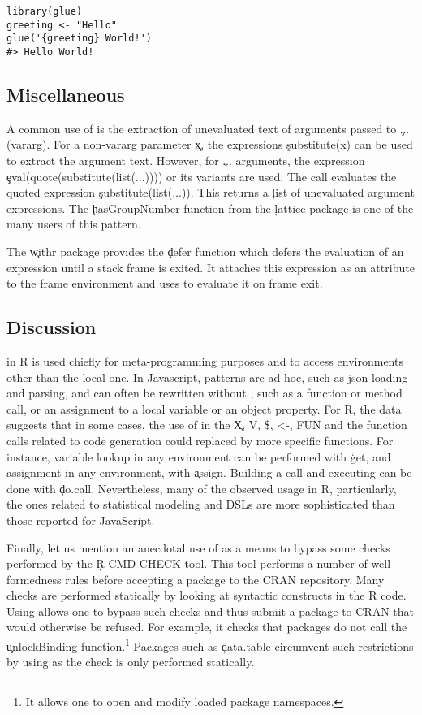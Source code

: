 \documentclass[screen,acmsmall]{acmart}
\begin{document}
\begin{lstlisting}
library(glue)
greeting <- "Hello"
glue('{greeting} World!')
#> Hello World!
\end{lstlisting}

\subsection{Miscellaneous}
A common use of \eval is the extraction of unevaluated text of arguments passed
to \c{...} (vararg). For a non-vararg parameter \c{x}, the expressions
\c{substitute(x)} can be used to extract the argument text. However, for \c{...}
arguments, the expression \c{eval(quote(substitute(list(...))))} or its variants
are used. The \eval call evaluates the quoted expression
\c{substitute(list(...))}. This returns a \c{list} of unevaluated argument
expressions. The \c{hasGroupNumber} function from the \c{lattice} package is one
of the many users of this pattern.

The \c{withr} package provides the \c{defer} function which defers the
evaluation of an expression until a stack frame is exited. It attaches this
expression as an attribute to the frame environment and uses \eval to evaluate
it on frame exit.

\subsection{Discussion}

\Eval in R is used chiefly for meta-programming purposes and to access
environments other than the local one. In Javascript, patterns are ad-hoc, such
as json loading and parsing, and can often be rewritten without \eval, such as a
function or method call, or an assignment to a local variable or an object
property. For R, the data suggests that in some cases, the use of \eval in the
\c{X, V, \$, <-, FUN} and the function calls related to code generation could
replaced by more specific functions. For instance, variable lookup in any
environment can be performed with \c{get}, and assignment in any environment,
with \c{assign}. Building a call and executing can be done with \c{do.call}.
Nevertheless, many of the observed \eval usage in R, particularly, the ones
related to statistical modeling and DSLs are more sophisticated than those
reported for JavaScript.

Finally, let us mention an anecdotal use of \eval as a means to bypass some
checks performed by the \c{R CMD CHECK} tool. This tool performs a number of
well-formedness rules before accepting a package to the CRAN repository. Many
checks are performed statically by looking at syntactic constructs in the R
code. Using \eval allows one to bypass such checks and thus submit a package to
CRAN that would otherwise be refused. For example,  it checks that packages
do not call the \c{unlockBinding} function.\footnote{It allows one to open and
modify loaded package namespaces.} Packages such as \c{data.table} circumvent
such restrictions by using \eval as the check is only performed statically.
\end{document}
